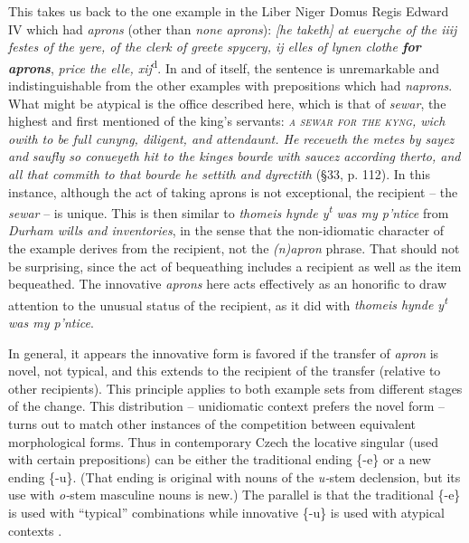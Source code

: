 \documentclass[output=paper,
modfonts
]{LSP/langsci}
\begin{document}
This takes us back to the one example in the Liber Niger Domus Regis
Edward IV which had \emph{aprons} (other than \emph{none aprons}):
\emph{{[}he taketh{]} at eueryche of the iiij festes of the yere, of the
clerk of greete spycery, ij elles of lynen clothe \textbf{for aprons}},
\emph{price the elle, xij}\textsuperscript{d}. In and of itself, the
sentence is unremarkable and indistinguishable from the other examples
with prepositions which had \emph{naprons}. What might be atypical is
the office described here, which is that of \emph{sewar}, the highest
 and first mentioned of the king's servants: \emph{\textsc{a
sewar for the kyng}, wich owith to be full cunyng, diligent, and
attendaunt. He receueth the metes by sayez and} \emph{saufly so
conueyeth hit to the kinges bourde with saucez according therto, and all
that commith to that bourde he settith and dyrectith} (§33, p. 112). In
this instance, although the act of taking aprons is not exceptional, the
recipient -- the \emph{sewar} -- is unique. This is then similar to
\emph{thomeis hynde y\textsuperscript{t} was my p'ntice} from \emph{Durham
wills and inventories}, in the sense that the non-idiomatic character of the example
derives from the recipient, not the \emph{(n)apron} phrase. That should
not be surprising, since the act of bequeathing includes a recipient as
well as the item bequeathed. The innovative \emph{aprons} here acts
effectively as an honorific to draw attention to the unusual status of
the recipient, as it did with \emph{thomeis hynde y\textsuperscript{t}
was my p'ntice}.

In general, it appears the innovative form is favored if the transfer of
\emph{apron} is novel, not typical, and this extends to the recipient of
the transfer (relative to other recipients). This principle applies to
both example sets from different stages of the change. This
distribution -- unidiomatic context prefers the novel form -- turns out to
match other instances of the competition between equivalent
morphological forms. Thus in contemporary Czech the locative singular
(used with certain prepositions) can be either the traditional ending
\{-e\} or a new ending \{-u\}. (That ending is original with nouns of
the  \emph{u-}stem declension, but its use with
\emph{o-}stem masculine nouns is new.) The parallel is that the
traditional \mbox{\{-e\}} is used with ``typical'' combinations while
innovative \{-u\} is used with atypical contexts \citep{BERM}.
\end{document}
